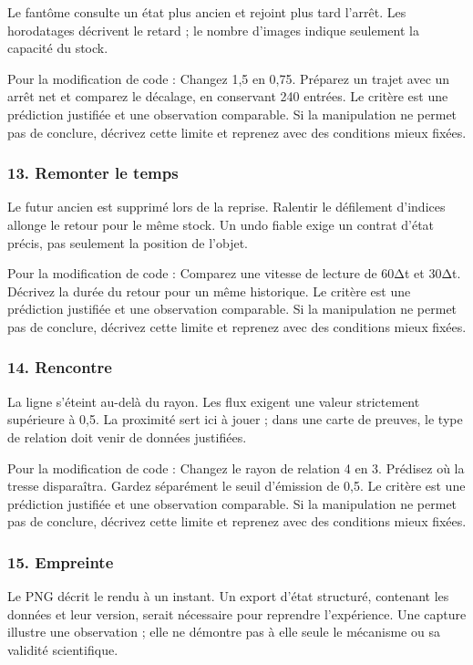 \documentclass[
  canadien,
  11pt,
  letterpaper,
]{article}
\begin{document}
Le fantôme consulte un état plus ancien et rejoint plus tard l'arrêt.
Les horodatages décrivent le retard ; le nombre d'images indique
seulement la capacité du stock.

Pour la modification de code : Changez 1,5 en 0,75. Préparez un trajet
avec un arrêt net et comparez le décalage, en conservant 240 entrées. Le
critère est une prédiction justifiée et une observation comparable. Si
la manipulation ne permet pas de conclure, décrivez cette limite et
reprenez avec des conditions mieux fixées.

\subsubsection{13. Remonter le temps}\label{remonter-le-temps}

Le futur ancien est supprimé lors de la reprise. Ralentir le défilement
d'indices allonge le retour pour le même stock. Un undo fiable exige un
contrat d'état précis, pas seulement la position de l'objet.

Pour la modification de code : Comparez une vitesse de lecture de 60Δt
et 30Δt. Décrivez la durée du retour pour un même historique. Le critère
est une prédiction justifiée et une observation comparable. Si la
manipulation ne permet pas de conclure, décrivez cette limite et
reprenez avec des conditions mieux fixées.

\subsubsection{14. Rencontre}\label{rencontre}

La ligne s'éteint au-delà du rayon. Les flux exigent une valeur
strictement supérieure à 0,5. La proximité sert ici à jouer ; dans une
carte de preuves, le type de relation doit venir de données justifiées.

Pour la modification de code : Changez le rayon de relation 4 en 3.
Prédisez où la tresse disparaîtra. Gardez séparément le seuil d'émission
de 0,5. Le critère est une prédiction justifiée et une observation
comparable. Si la manipulation ne permet pas de conclure, décrivez cette
limite et reprenez avec des conditions mieux fixées.

\subsubsection{15. Empreinte}\label{empreinte}

Le PNG décrit le rendu à un instant. Un export d'état structuré,
contenant les données et leur version, serait nécessaire pour reprendre
l'expérience. Une capture illustre une observation ; elle ne démontre
pas à elle seule le mécanisme ou sa validité scientifique.
\end{document}
